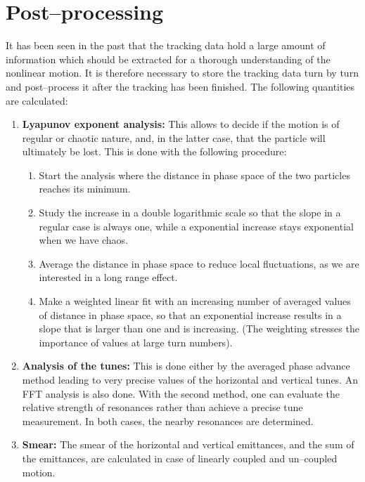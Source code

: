 \section{Post--processing} \label{PosPro}

It has been seen in the past that the tracking data hold a large amount of information which should be extracted for a thorough understanding of the nonlinear motion.
It is therefore necessary to store the tracking data turn by turn and post--process it after the tracking has been finished.
The following quantities are calculated:

\begin{enumerate}
    \item \textbf{Lyapunov exponent analysis:} This allows to decide if the motion is of regular or chaotic nature, and, in the latter case, that the particle will ultimately be lost. This is done with the following procedure:
    \begin{enumerate}
        \item Start the analysis where the distance in phase space of the two particles reaches its minimum.
        \item Study the increase in a double logarithmic scale so that the slope in a regular case is always one, while a exponential increase stays exponential when we have chaos.
        \item Average the distance in phase space to reduce local fluctuations, as we are interested in a long range effect.
        \item Make a weighted linear fit with an increasing number of averaged values of distance in phase space, so that an exponential increase results in a slope that is larger than one and is increasing. (The weighting stresses the importance of values at large turn numbers).
    \end{enumerate}
    \item \textbf{Analysis of the tunes:} This is done either by the averaged phase advance method leading to very precise values of the horizontal and vertical tunes. An FFT analysis is also done. With the second method, one can evaluate the relative strength of resonances rather than achieve a precise tune measurement. In both cases, the nearby resonances are determined.
    \item \textbf{Smear:} The smear of the horizontal and vertical emittances, and the sum of the emittances, are calculated in case of linearly coupled and un--coupled motion.

\end{enumerate}

